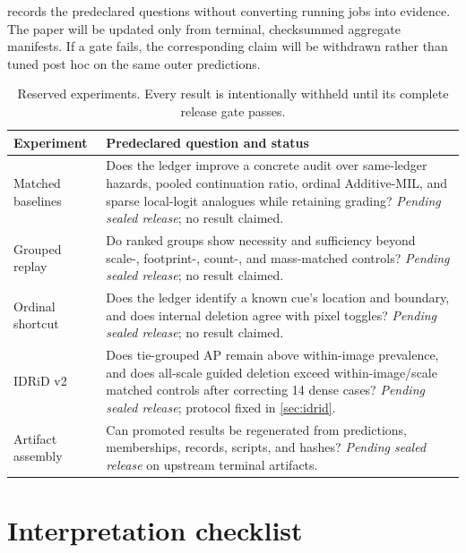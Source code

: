 \documentclass[10pt,twocolumn,letterpaper]{article}
\newcommand{\pending}{\textit{Pending sealed release}}
\begin{document}
 records the predeclared questions without converting running
jobs into evidence.  The paper will be updated only from terminal, checksummed
aggregate manifests.  If a gate fails, the corresponding claim will be
withdrawn rather than tuned post hoc on the same outer predictions.

\begin{table}[t]
  \centering
  \caption{Reserved experiments.  Every result is intentionally withheld until
  its complete release gate passes.}
  \label{tab:pending}
  \scriptsize
  \setlength{\tabcolsep}{3pt}
  \begin{tabular}{@{}p{1.7cm}p{5.4cm}@{}}
    \toprule
    Experiment & Predeclared question and status \\
    \midrule
    Matched baselines & Does the ledger improve a concrete audit over same-ledger hazards, pooled continuation ratio, ordinal Additive-MIL, and sparse local-logit analogues while retaining grading?  \pending; no result claimed. \\
    Grouped replay & Do ranked groups show necessity and sufficiency beyond scale-, footprint-, count-, and mass-matched controls?  \pending; no result claimed. \\
    Ordinal shortcut & Does the ledger identify a known cue's location and boundary, and does internal deletion agree with pixel toggles?  \pending; no result claimed. \\
    IDRiD v2 & Does tie-grouped AP remain above within-image prevalence, and does all-scale guided deletion exceed within-image/scale matched controls after correcting 14 dense cases?  \pending; protocol fixed in \cref{sec:idrid}. \\
    Artifact assembly & Can promoted results be regenerated from predictions, memberships, records, scripts, and hashes?  \pending{} on upstream terminal artifacts. \\
    \bottomrule
  \end{tabular}
\end{table}

\section{Interpretation checklist}
\label{sec:claims}
\end{document}
